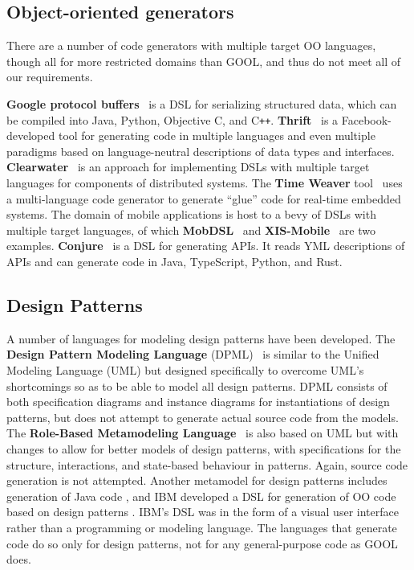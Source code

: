 \documentclass[sigplan,review,anonymous,prologue,dvipsnames]{acmart}
\newcommand{\Cplusplus}{C\texttt{++}}
\begin{document}
\subsection{Object-oriented generators}

There are a number of code generators with multiple target OO languages,
though all for more restricted domains than GOOL, and thus do not meet all
of our requirements.

\textbf{Google protocol buffers}~\cite{Protobuf} is a DSL for serializing
structured data, which can be compiled into Java, Python, Objective C, and
\Cplusplus.  \textbf{Thrift}~\cite{slee2007thrift} is a Facebook-developed tool
for generating code in multiple languages and even multiple paradigms based on
language-neutral descriptions of data types and interfaces.
\textbf{Clearwater}~\cite{swint2005clearwater} is an approach for implementing
DSLs with multiple target languages for components of distributed systems.  The
\textbf{Time Weaver} tool~\cite{de2004glue} uses a multi-language code
generator to generate ``glue'' code for real-time embedded systems.  The domain
of mobile applications is host to a bevy of DSLs with multiple target
languages, of which \textbf{MobDSL}~\cite{kramer2010mobdsl} and
\textbf{XIS-Mobile}~\cite{ribeiro2014xis} are two examples.
\textbf{Conjure}~\cite{Conjure} is a DSL for generating APIs. It reads YML
descriptions of APIs and can generate code in Java, TypeScript, Python, and
Rust.

\subsection{Design Patterns}

A number of languages for modeling design patterns have been developed. The
\textbf{Design Pattern Modeling Language} (DPML)~\cite{mapelsden2002design} is similar
to the Unified Modeling Language (UML) but designed specifically to overcome
UML's shortcomings so as to be able to model all design patterns. DPML consists of
both specification diagrams and instance diagrams for instantiations of design
patterns, but does not attempt to generate actual source code from the models.
The \textbf{Role-Based Metamodeling Language}~\cite{kim2003uml} is also based on UML but
with changes to allow for better models of design patterns, with specifications
for the structure, interactions, and state-based behaviour in patterns. Again,
source code generation is not attempted. Another metamodel for design patterns
includes generation of Java code \cite{albin2001meta}, and IBM developed a DSL
for generation of OO code based on design patterns
\cite{budinsky1996automatic}. IBM's DSL was in the form of a visual user
interface rather than a programming or modeling language. The languages that
generate code do so only for design patterns, not for any general-purpose code
as GOOL does.
\end{document}
